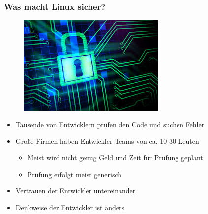 \begin{frame}
\frametitle{Was macht Linux sicher?}
\begin{figure}
\includegraphics[scale=0.33]{resources/sec.jpeg}
\end{figure}
\begin{itemize}
	\item Tausende von Entwicklern prüfen den Code und suchen Fehler
	\item Große Firmen haben Entwickler-Teams von ca. 10-30 Leuten 
	\begin{itemize}
		\item Meist wird nicht genug Geld und Zeit für Prüfung geplant
		\item Prüfung erfolgt meist generisch
	\end{itemize}
	\item Vertrauen der Entwickler untereinander
	\item Denkweise der Entwickler ist anders
\end{itemize}
\end{frame}

